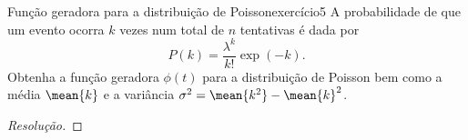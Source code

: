 \begin{exercício}{Função geradora para a distribuição de Poisson}{exercício5}
    A probabilidade de que um evento ocorra \(k\) vezes num total de \(n\) tentativas é dada por
    \begin{equation*}
        P(k) = \frac{\lambda^k}{k!}\exp(-k).
    \end{equation*}
    Obtenha a função geradora \(\phi(t)\) para a distribuição de Poisson bem como a média \(\mean{k}\) e a variância \(\sigma^2 = \mean{k^2} - \mean{k}^2\).
\end{exercício}
\begin{proof}[Resolução]

\end{proof}

